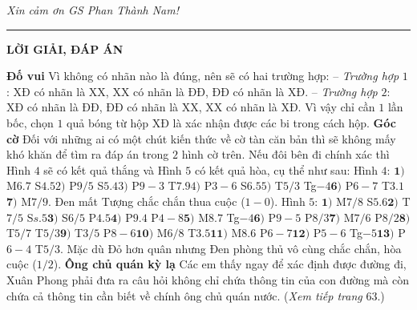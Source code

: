 \begin{multicols}{2}
	\vskip 0.1cm
	\textit{Xin cảm ơn GS Phan Thành Nam!} 
\end{multicols}
\vspace*{-10pt}
\rule{1\linewidth}{0.1pt}

\vspace*{10pt}
\centerline{\LARGE{\textbf{\color{diendantoanhoc}LỜI GIẢI, ĐÁP ÁN}}}
\begin{multicols}{2}
	\textbf{\color{diendantoanhoc}Đố vui}
	\vskip 0.1cm
	Vì không có nhãn nào là đúng, nên sẽ có hai trường hợp:
	\vskip 0.1cm
	-- \textit{Trường hợp} $1$: XĐ có nhãn là XX, XX có nhãn là ĐĐ, ĐĐ có nhãn là XĐ.
	\vskip 0.1cm
	-- \textit{Trường hợp} $2$: XĐ có nhãn là ĐĐ, ĐĐ có nhãn là XX, XX có nhãn là XĐ. 
	\vskip 0.1cm
	Vì vậy chỉ cần $1$ lần bốc, chọn $1$ quả bóng từ hộp XĐ là xác nhận được các bi trong cách hộp.
	\vskip 0.1cm
	\textbf{\color{diendantoanhoc}Góc cờ}
	\vskip 0.1cm
	Đối với những ai có một chút kiến thức về cờ tàn căn bản thì sẽ không mấy khó khăn để tìm ra đáp án trong $2$ hình cờ trên. Nếu đôi bên đi chính xác thì Hình $4$ sẽ có kết quả thắng và Hình $5$ có kết quả hòa, cụ thể như sau: 
	\vskip 0.1cm
	Hình $4$: $\pmb{1)}$ M$6.7$ S$4.5$\quad $2)$ P$9/5$ S$5.4$\quad $3)$ P$9-3$ T$7.9$\quad $4)$ P$3-6$ S$6.5$\quad $5)$ T$5/3$ Tg$-4$\quad $\pmb{6)}$ P$6-7$ T$3.1$ \quad $\pmb{7)}$ M$7/9$. Đen mất Tượng chắc chắn thua cuộc ($1-0$).
	\vskip 0.1cm
	Hình $5$: $\pmb{1)}$ M$7/8$ S$5.6$\quad $\pmb{2)}$ T$7/5$ S$s.5$\quad $\pmb{3)}$ S$6/5$ P$4.5$\quad $\pmb{4)}$ P$9.4$ P$4-8$\quad $\pmb{5)}$ M$8.7$ Tg$-4$\quad $\pmb{6)}$ P$9-5$ P$8/3$\quad $\pmb{7)}$ M$7/6$ P$8/2$\quad $\pmb{8)}$ T$5/7$ T$5/3$\quad $\pmb{9)}$ T$3/5$ P$8-6$\quad $\pmb{10)}$ M$6/8$ T$3.5$\quad $\pmb{11)}$ M$8.6$ P$6-7$\quad $\pmb{12)}$ P$5-6$ Tg$-5$\quad $\pmb{13)}$ P$6-4$ T$5/3$. Mặc dù Đỏ hơn quân nhưng Đen phòng thủ vô cùng chắc chắn, hòa cuộc ($1/2$).
	\vskip 0.1cm
	\textbf{\color{diendantoanhoc}Ông chủ quán kỳ lạ}
	\vskip 0.1cm
	Các em thấy ngay để xác định được đường đi, Xuân Phong phải đưa ra câu hỏi không chỉ chứa thông tin của con đường mà còn chứa cả thông tin cần biết về chính ông chủ quán nước.
	\vskip 0.1cm
	\hfill(\textit{Xem tiếp trang} $63$.)
\end{multicols}